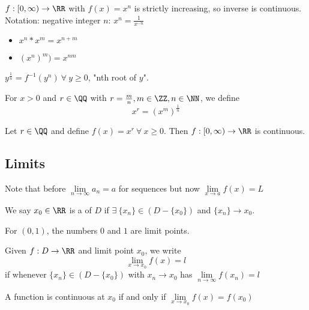 \documentclass[12pt]{scrartcl}
\newcommand{\Lim}{\underset{n\to\infty}{\lim}}
\begin{document}
\begin{example}
  $f: [0, \infty) \to \RR$ with $f(x) = x^n$ is strictly increasing, so inverse 
  is continuous. Notation: negative integer $n$: $x^n = \frac{1}{x^{-n}}$
  \begin{itemize}
    \item $x^n * x^m = x^{n + m}$
    \item $(x^n)^m) = x^{nm}$
  \end{itemize}
  $y^{\frac{1}{n}} = f^{-1}(y^n) \ \forall \ y \geq 0$, "nth root of $y$".
\end{example}

\begin{definition}
  For $x > 0$ and $r \in \QQ$ with $r = \frac{m}{n}, m \in \ZZ, n \in \NN$, we define 
  \[x^r = (x^m)^{\frac{1}{n}}\]
\end{definition}

\begin{remark}
  Let $r \in \QQ$ and define $f(x) = x^r \ \forall \ x \geq 0$. Then $f: [0, \infty) \to \RR$ is 
  continuous. 
\end{remark}

\subsection{Limits}

\begin{note}
  Note that before $\Lim a_n = a$ for sequences but now $\underset{x\to a}{\lim}f(x) = L$
\end{note}

\begin{definition}
  We say $x_0 \in \RR$ is a  of $D$ if $\exists \ \{x_n\} \in (D - \{x_0\})$
  and $\{x_n\} \to x_0$.
\end{definition}

\begin{example}
  For $(0, 1)$, the numbers $0$ and $1$ are limit points.
\end{example}

\begin{definition}
  Given $f: D \to \RR$ and limit point $x_0$, we write 
  \[\lim_{x\to x_0} f(x) = l\]
  if whenever $\{x_n\} \in (D - \{x_0\})$ with $x_n \to x_0$ has $\Lim f(x_n) = l$
\end{definition}

\begin{remark}
  A function is continuous at $x_0$ if and only if $\underset{x\to x_0}{\lim}f(x) = f(x_0)$
\end{remark}
\end{document}
